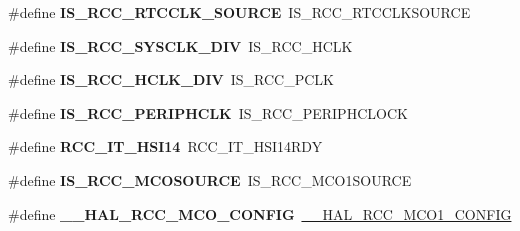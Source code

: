 \begin{DoxyCompactItemize}
\item 
\hypertarget{group___h_a_l___r_c_c___aliased_gafbf1d14cdfb90a3da2148a8b398fae50}{\#define {\bfseries I\-S\-\_\-\-R\-C\-C\-\_\-\-R\-T\-C\-C\-L\-K\-\_\-\-S\-O\-U\-R\-C\-E}~I\-S\-\_\-\-R\-C\-C\-\_\-\-R\-T\-C\-C\-L\-K\-S\-O\-U\-R\-C\-E}\label{group___h_a_l___r_c_c___aliased_gafbf1d14cdfb90a3da2148a8b398fae50}

\item 
\hypertarget{group___h_a_l___r_c_c___aliased_ga43366c08676a120c9c7ec17169183054}{\#define {\bfseries I\-S\-\_\-\-R\-C\-C\-\_\-\-S\-Y\-S\-C\-L\-K\-\_\-\-D\-I\-V}~I\-S\-\_\-\-R\-C\-C\-\_\-\-H\-C\-L\-K}\label{group___h_a_l___r_c_c___aliased_ga43366c08676a120c9c7ec17169183054}

\item 
\hypertarget{group___h_a_l___r_c_c___aliased_ga10acdfe634bde9d8591127e09c290178}{\#define {\bfseries I\-S\-\_\-\-R\-C\-C\-\_\-\-H\-C\-L\-K\-\_\-\-D\-I\-V}~I\-S\-\_\-\-R\-C\-C\-\_\-\-P\-C\-L\-K}\label{group___h_a_l___r_c_c___aliased_ga10acdfe634bde9d8591127e09c290178}

\item 
\hypertarget{group___h_a_l___r_c_c___aliased_gad38e6304f89528092a9a24943b955d03}{\#define {\bfseries I\-S\-\_\-\-R\-C\-C\-\_\-\-P\-E\-R\-I\-P\-H\-C\-L\-K}~I\-S\-\_\-\-R\-C\-C\-\_\-\-P\-E\-R\-I\-P\-H\-C\-L\-O\-C\-K}\label{group___h_a_l___r_c_c___aliased_gad38e6304f89528092a9a24943b955d03}

\item 
\hypertarget{group___h_a_l___r_c_c___aliased_ga1d2b2eb3fca0475683b879377c952fbf}{\#define {\bfseries R\-C\-C\-\_\-\-I\-T\-\_\-\-H\-S\-I14}~R\-C\-C\-\_\-\-I\-T\-\_\-\-H\-S\-I14\-R\-D\-Y}\label{group___h_a_l___r_c_c___aliased_ga1d2b2eb3fca0475683b879377c952fbf}

\item 
\hypertarget{group___h_a_l___r_c_c___aliased_ga6ae382b78e1bcec3da6d5ac79b1a5551}{\#define {\bfseries I\-S\-\_\-\-R\-C\-C\-\_\-\-M\-C\-O\-S\-O\-U\-R\-C\-E}~I\-S\-\_\-\-R\-C\-C\-\_\-\-M\-C\-O1\-S\-O\-U\-R\-C\-E}\label{group___h_a_l___r_c_c___aliased_ga6ae382b78e1bcec3da6d5ac79b1a5551}

\item 
\hypertarget{group___h_a_l___r_c_c___aliased_ga4a5994f41cd6798807bf8672ec3dc423}{\#define {\bfseries \-\_\-\-\_\-\-H\-A\-L\-\_\-\-R\-C\-C\-\_\-\-M\-C\-O\-\_\-\-C\-O\-N\-F\-I\-G}~\hyperlink{group___r_c_c_ex___m_c_ox___clock___config_ga7e5f7f1efc92794b6f0e96068240b45e}{\-\_\-\-\_\-\-H\-A\-L\-\_\-\-R\-C\-C\-\_\-\-M\-C\-O1\-\_\-\-C\-O\-N\-F\-I\-G}}\label{group___h_a_l___r_c_c___aliased_ga4a5994f41cd6798807bf8672ec3dc423}


\end{DoxyCompactItemize}

